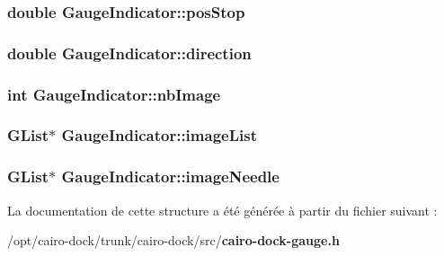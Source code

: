 \subsubsection{\setlength{\rightskip}{0pt plus 5cm}double {\bf GaugeIndicator::posStop}}\label{structGaugeIndicator_3926fe28b1ad1b8824a0d9416c658457}


\subsubsection{\setlength{\rightskip}{0pt plus 5cm}double {\bf GaugeIndicator::direction}}\label{structGaugeIndicator_cec21642e0c4e6a17b396015017adc05}


\subsubsection{\setlength{\rightskip}{0pt plus 5cm}int {\bf GaugeIndicator::nbImage}}\label{structGaugeIndicator_58ae7782a5223a6ece14931fc21b69d5}


\subsubsection{\setlength{\rightskip}{0pt plus 5cm}GList$\ast$ {\bf GaugeIndicator::imageList}}\label{structGaugeIndicator_df6d586a923d1cd78433b3e29a2a3cf3}


\subsubsection{\setlength{\rightskip}{0pt plus 5cm}GList$\ast$ {\bf GaugeIndicator::imageNeedle}}\label{structGaugeIndicator_2d2d6acfe62902762d4c1a3ca4db518f}




La documentation de cette structure a été générée à partir du fichier suivant :\begin{CompactItemize}
\item 
/opt/cairo-dock/trunk/cairo-dock/src/{\bf cairo-dock-gauge.h}\end{CompactItemize}
